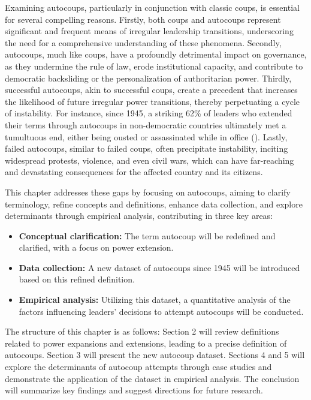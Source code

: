 \documentclass[
  12pt,
]{report}
\begin{document}
Examining autocoups, particularly in conjunction with classic coups, is
essential for several compelling reasons. Firstly, both coups and
autocoups represent significant and frequent means of irregular
leadership transitions, underscoring the need for a comprehensive
understanding of these phenomena. Secondly, autocoups, much like coups,
have a profoundly detrimental impact on governance, as they undermine
the rule of law, erode institutional capacity, and contribute to
democratic backsliding or the personalization of authoritarian power.
Thirdly, successful autocoups, akin to successful coups, create a
precedent that increases the likelihood of future irregular power
transitions, thereby perpetuating a cycle of instability. For instance,
since 1945, a striking 62\% of leaders who extended their terms through
autocoups in non-democratic countries ultimately met a tumultuous end,
either being ousted or assassinated while in office
(). Lastly, failed autocoups,
similar to failed coups, often precipitate instability, inciting
widespread protests, violence, and even civil wars, which can have
far-reaching and devastating consequences for the affected country and
its citizens.

This chapter addresses these gaps by focusing on autocoups, aiming to
clarify terminology, refine concepts and definitions, enhance data
collection, and explore determinants through empirical analysis,
contributing in three key areas:

\begin{itemize}
\item
  \textbf{Conceptual clarification:} The term autocoup will be redefined
  and clarified, with a focus on power extension.
\item
  \textbf{Data collection:} A new dataset of autocoups since 1945 will
  be introduced based on this refined definition.
\item
  \textbf{Empirical analysis:} Utilizing this dataset, a quantitative
  analysis of the factors influencing leaders' decisions to attempt
  autocoups will be conducted.
\end{itemize}

The structure of this chapter is as follows: Section 2 will review
definitions related to power expansions and extensions, leading to a
precise definition of autocoups. Section 3 will present the new autocoup
dataset. Sections 4 and 5 will explore the determinants of autocoup
attempts through case studies and demonstrate the application of the
dataset in empirical analysis. The conclusion will summarize key
findings and suggest directions for future research.
\end{document}

